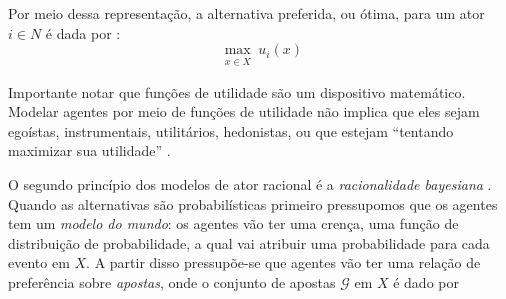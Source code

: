 Por meio dessa representação, a alternativa preferida, ou ótima, para um ator $i
\in N$ é dada por \cite{binmore2008rational}:
\[\max_{\substack{x \in X}}
  u_i(x)
  \]

Importante notar que funções de utilidade são um dispositivo matemático. Modelar
agentes por meio de funções de utilidade 
não implica que eles sejam  egoístas, instrumentais, utilitários,
hedonistas, ou que estejam ``tentando maximizar sua utilidade''
\cite{gaus2007philosophy}.

O segundo princípio dos modelos de ator racional é a \textit{racionalidade
  bayesiana} \cite{gintis2016individuality}. Quando as alternativas são
probabilísticas primeiro pressupomos que os agentes tem um \textit{modelo do
  mundo}\cite{acemoglu2011opinion}: os agentes vão ter uma crença, uma função de
distribuição de probabilidade, a qual vai atribuir uma probabilidade para cada
evento em \(X\). A partir disso pressupõe-se que agentes vão ter uma relação de
preferência sobre \textit{apostas}\cite{jehle2001advanced}, onde o conjunto de
apostas \(\mathcal{G}\) em \(X\) é dado por







 











